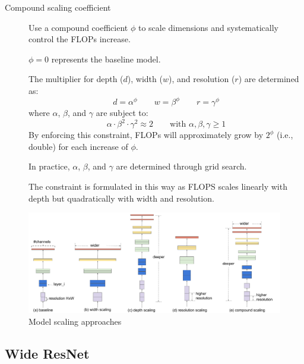 \begin{description}
        \begin{description}
            \item[Compound scaling coefficient]
                Use a compound coefficient $\phi$ to scale dimensions and systematically control the FLOPs increase.
                \begin{remark}
                    $\phi=0$ represents the baseline model.
                \end{remark}

                The multiplier for depth ($d$), width ($w$), and resolution ($r$) are determined as:
                \[ d = \alpha^\phi \qquad w = \beta^\phi \qquad r = \gamma^\phi \]
                where $\alpha$, $\beta$, and $\gamma$ are subject to:
                \[ \alpha \cdot \beta^2 \cdot \gamma^2 \approx 2 \qquad \text{with } \alpha, \beta, \gamma \geq 1 \]
                By enforcing this constraint, FLOPs will approximately grow by $2^\phi$ (i.e., double) for each increase of $\phi$. 

                In practice, $\alpha$, $\beta$, and $\gamma$ are determined through grid search.

                \begin{remark}
                    The constraint is formulated in this way as FLOPS scales linearly with depth but quadratically with width and resolution.
                \end{remark}
        \end{description}
\end{description}

\begin{figure}[H]
    \centering
    \includegraphics[width=0.95\linewidth]{./img/_model_scaling.pdf}
    \caption{Model scaling approaches}
\end{figure}


\subsection{Wide ResNet}

